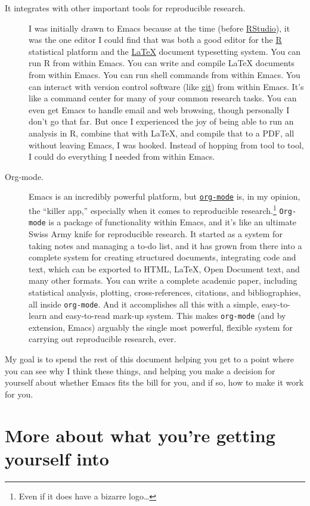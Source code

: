 \documentclass{article}
\begin{document}
\begin{description}
\item[It integrates with other important tools for reproducible research.] I was initially drawn to Emacs because at the time (before \href{http://www.rstudio.com/}{RStudio}), it was the one editor I could find that was both a good editor for the \href{http://www.r-project.org/}{R} statistical platform and the \href{http://www.latex-project.org/}{\LaTeX{}} document typesetting system. You can run R from within Emacs. You can write and compile \LaTeX{} documents from within Emacs. You can run shell commands from within Emacs.  You can interact with version control software (like \href{http://git-scm.com/}{git}) from within Emacs. It's like a command center for many of your common research tasks. You can even get Emacs to handle email and web browsing, though personally I don't go that far. But once I experienced the joy of being able to run an analysis in R, combine that with \LaTeX{}, and compile that to a PDF, all without leaving Emacs, I was hooked. Instead of hopping from tool to tool, I could do everything I needed from within Emacs.
\item[Org-mode.] Emacs is an incredibly powerful platform, but \texttt{\href{http://orgmode.org/}{org-mode}} is, in my opinion, the ``killer app,'' especially when it comes to reproducible research.\footnote{Even if it does have a bizarre logo\ldots{}
 } \texttt{Org-mode} is a package of functionality within Emacs, and it's like an ultimate Swiss Army knife for reproducible research. It started as a system for taking notes and managing a to-do list, and it has grown from there into a complete system for creating structured documents, integrating code and text, which can be exported to HTML, \LaTeX{}, Open Document text, and many other formats. You can write a complete academic paper, including statistical analysis, plotting, cross-references, citations, and bibliographies, all inside \texttt{org-mode}. And it accomplishes all this with a simple, easy-to-learn and easy-to-read mark-up system. This makes \texttt{org-mode} (and by extension, Emacs) arguably the single most powerful, flexible system for carrying out reproducible research, ever.
\end{description}

My goal is to spend the rest of this document helping you get to a point where you can see why I think these things, and helping you make a decision for yourself about whether Emacs fits the bill for you, and if so, how to make it work for you.
\section{More about what you're getting yourself into}
\label{sec-2}
\end{document}

